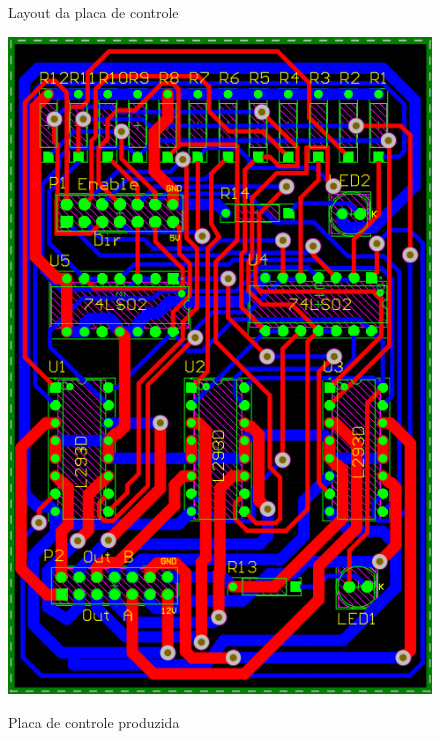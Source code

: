\begin{figure}[H]
    \begin{minipage}{.5\textwidth}
        \centering
        \caption{Layout da placa de controle}
        \includegraphics[keepaspectratio=true, width=0.9\linewidth]
            {img/placa-controle-layout.png}
        \label{fig:placaControleLayout}
    \end{minipage}%
    \begin{minipage}{.5\textwidth}
        \centering
        \caption{Placa de controle produzida}

\end{minipage}
\end{figure}
